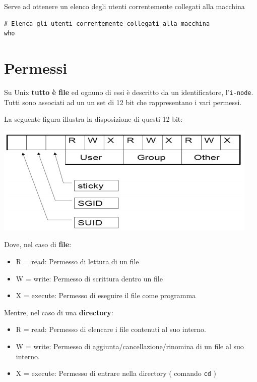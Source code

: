 \documentclass[a4paper]{report}
\newenvironment{code}{\begin{tcolorbox}[size=small]}{\end{tcolorbox}}
\begin{document}
Serve ad ottenere un elenco degli utenti correntemente collegati alla macchina
\begin{code} 
\begin{lstlisting}
# Elenca gli utenti correntemente collegati alla macchina
who
\end{lstlisting}
\end{code}

\chapter{Permessi}

Su Unix \textbf{tutto è file} ed ognuno di essi è descritto da un identificatore, l'\texttt{i-node}. Tutti sono associati ad un un set di 12 bit che rappresentano i vari permessi.

La seguente figura illustra la disposizione di questi 12 bit:

\begin{center}
	\includegraphics[width=0.6\linewidth]{permessi}
\end{center}

Dove, nel caso di\textbf{ file}:

\begin{itemize}
	\item R = read: Permesso di lettura di un file
	\item W = write: Permesso di scrittura dentro un file
	\item X = execute: Permesso di eseguire il file come programma
\end{itemize}

Mentre, nel caso di una\textbf{ directory}:

\begin{itemize}
	\item R = read: Permesso di elencare i file contenuti al suo interno.
	\item W = write: Permesso di aggiunta/cancellazione/rinomina di un file al suo interno.
	\item X = execute: Permesso di entrare nella directory ( comando \texttt{cd} )
\end{itemize}
\end{document}
